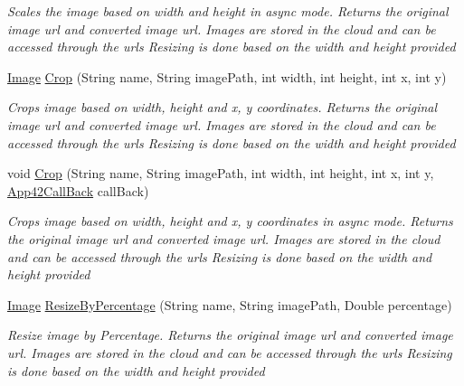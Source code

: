 \begin{DoxyCompactItemize}
\begin{DoxyCompactList}\small\item\em Scales the image based on width and height in async mode. Returns the original image url and converted image url. Images are stored in the cloud and can be accessed through the urls Resizing is done based on the width and height provided \end{DoxyCompactList}\item 
\hyperlink{classcom_1_1shephertz_1_1app42_1_1paas_1_1sdk_1_1csharp_1_1image_processor_1_1_image}{Image} \hyperlink{classcom_1_1shephertz_1_1app42_1_1paas_1_1sdk_1_1csharp_1_1image_processor_1_1_image_processor_service_a5f6a00efdf9c48db71bbcc999a3fc5fd}{Crop} (String name, String image\+Path, int width, int height, int x, int y)
\begin{DoxyCompactList}\small\item\em Crops image based on width, height and x, y coordinates. Returns the original image url and converted image url. Images are stored in the cloud and can be accessed through the urls Resizing is done based on the width and height provided \end{DoxyCompactList}\item 
void \hyperlink{classcom_1_1shephertz_1_1app42_1_1paas_1_1sdk_1_1csharp_1_1image_processor_1_1_image_processor_service_ad6ec2b155f6dcce0a761077c291acc0f}{Crop} (String name, String image\+Path, int width, int height, int x, int y, \hyperlink{interfacecom_1_1shephertz_1_1app42_1_1paas_1_1sdk_1_1csharp_1_1_app42_call_back}{App42\+Call\+Back} call\+Back)
\begin{DoxyCompactList}\small\item\em Crops image based on width, height and x, y coordinates in async mode. Returns the original image url and converted image url. Images are stored in the cloud and can be accessed through the urls Resizing is done based on the width and height provided \end{DoxyCompactList}\item 
\hyperlink{classcom_1_1shephertz_1_1app42_1_1paas_1_1sdk_1_1csharp_1_1image_processor_1_1_image}{Image} \hyperlink{classcom_1_1shephertz_1_1app42_1_1paas_1_1sdk_1_1csharp_1_1image_processor_1_1_image_processor_service_abfa1725382e7b05610836c82b8a021a8}{Resize\+By\+Percentage} (String name, String image\+Path, Double percentage)
\begin{DoxyCompactList}\small\item\em Resize image by Percentage. Returns the original image url and converted image url. Images are stored in the cloud and can be accessed through the urls Resizing is done based on the width and height provided \end{DoxyCompactList}\item 

\end{DoxyCompactItemize}
